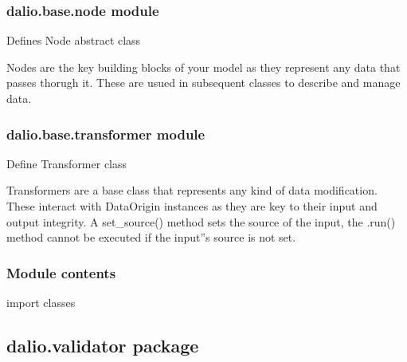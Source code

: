 \documentclass[letterpaper,10pt,english]{sphinxmanual}
\begin{document}
\begin{fulllineitems}
\begin{fulllineitems}
\begin{quote}
\begin{description}
\end{description}\end{quote}

\end{fulllineitems}


\end{fulllineitems}



\subsubsection{dalio.base.node module}
\label{\detokenize{dalio.base:module-dalio.base.node}}\label{\detokenize{dalio.base:dalio-base-node-module}}
Defines Node abstract class

Nodes are the key building blocks of your model as they represent any data
that passes thorugh it. These are usued in subsequent classes to describe and
manage data.


\subsubsection{dalio.base.transformer module}
\label{\detokenize{dalio.base:module-dalio.base.transformer}}\label{\detokenize{dalio.base:dalio-base-transformer-module}}
Define Transformer class

Transformers are a base class that represents any kind of data modification.
These interact with DataOrigin instances as they are key to their input and
output integrity. A set\_source() method sets the source of the input, the
.run() method cannot be executed if the input”s source is not set.


\subsubsection{Module contents}
\label{\detokenize{dalio.base:module-dalio.base}}\label{\detokenize{dalio.base:module-contents}}
import classes


\subsection{dalio.validator package}
\label{\detokenize{dalio.validator:dalio-validator-package}}\label{\detokenize{dalio.validator::doc}}
\end{document}
